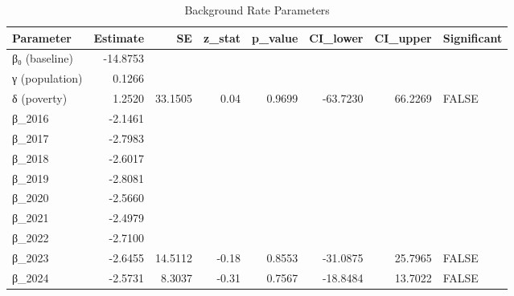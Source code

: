 \begin{table}[ht]
\centering
\begin{tabular}{lrrrrrrl}
  \hline
Parameter & Estimate & SE & z\_stat & p\_value & CI\_lower & CI\_upper & Significant \\ 
  \hline
β₀ (baseline) & -14.8753 &  &  &  &  &  &  \\ 
  γ (population) & 0.1266 &  &  &  &  &  &  \\ 
  δ (poverty) & 1.2520 & 33.1505 & 0.04 & 0.9699 & -63.7230 & 66.2269 & FALSE \\ 
  β\_2016 & -2.1461 &  &  &  &  &  &  \\ 
  β\_2017 & -2.7983 &  &  &  &  &  &  \\ 
  β\_2018 & -2.6017 &  &  &  &  &  &  \\ 
  β\_2019 & -2.8081 &  &  &  &  &  &  \\ 
  β\_2020 & -2.5660 &  &  &  &  &  &  \\ 
  β\_2021 & -2.4979 &  &  &  &  &  &  \\ 
  β\_2022 & -2.7100 &  &  &  &  &  &  \\ 
  β\_2023 & -2.6455 & 14.5112 & -0.18 & 0.8553 & -31.0875 & 25.7965 & FALSE \\ 
  β\_2024 & -2.5731 & 8.3037 & -0.31 & 0.7567 & -18.8484 & 13.7022 & FALSE \\ 
   \hline
\end{tabular}
\caption{Background Rate Parameters} 
\label{tab:background}
\end{table}
